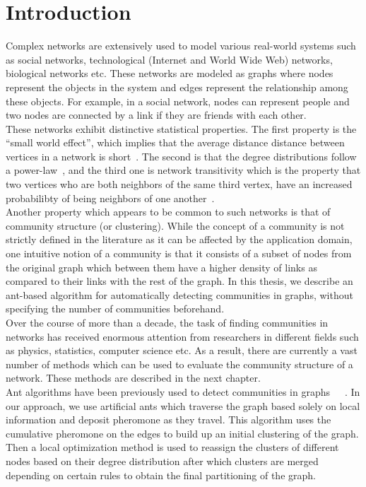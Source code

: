 \chapter{Introduction}
\begin{spacing}{1.5}
\thispagestyle{empty}
Complex networks are extensively used to model various real-world systems such as social networks, technological (Internet and World Wide Web) networks, biological networks etc. These networks are modeled as graphs where nodes represent the objects in the system and edges represent the relationship among these objects. For example, in a social network, nodes can represent people and two nodes are connected by a link if they are friends with each other. \\
\indent These networks exhibit distinctive statistical properties. The first property is the ``small world effect'', which implies that the average distance distance between vertices in a network is short~\cite{milgram67smallworld}. The second is that the degree distributions follow a power-law~\cite{Barabasi99emergenceScaling}, and the third one is network transitivity which is the property that two vertices who are both neighbors of the same third vertex, have an increased probabilibty of being neighbors of one another~\cite{Watts-Colective-1998}.\\
\indent Another property which appears to be common to such networks is that of community structure (or clustering). While the concept of a community is not strictly defined in the literature as it can be affected by the application domain, one intuitive notion of a community is that it consists of a subset of nodes from the original graph which between them have a higher density of links as compared to their links with the rest of the graph. In this thesis, we describe an ant-based algorithm for automatically detecting communities in graphs, without specifying the number of communities beforehand.\\
\indent Over the course of more than a decade, the task of finding communities in networks has received enormous attention from researchers in different fields such as physics, statistics, computer science etc. As a result, there are currently a vast number of methods which can be used to evaluate the community structure of a network. These methods are described in the next chapter.\\
\indent Ant algorithms have been previously used to detect communities in graphs~\cite{DBLP:journals/corr/abs-1303-4711}~\cite{5586496}~\cite{Jin:2011:ACO:2022850.2022861}. In our approach, we use artificial ants which traverse the graph based solely on local information and deposit pheromone as they travel. This algorithm uses the cumulative pheromone on the edges to build up an initial clustering of the graph. Then a local optimization method is used to reassign the clusters of different nodes based on their degree distribution after which clusters are merged depending on certain rules to obtain the final partitioning of the graph.\\

\end{spacing}
